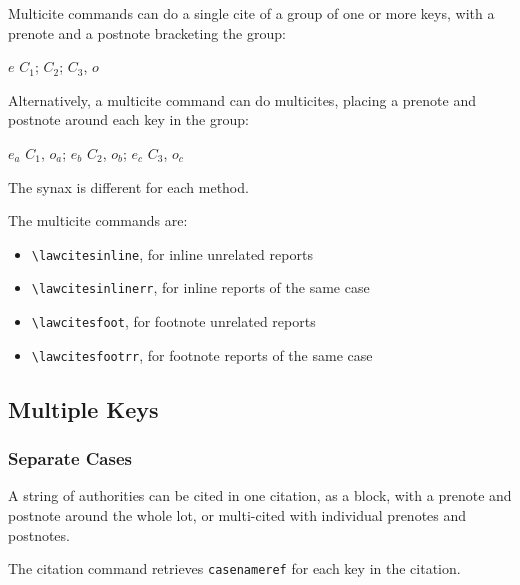 Multicite commands can do a single cite of a group of one or more keys, with a prenote and a postnote bracketing the group:

\begin{center}
\colorbox{yellow!12}{$e$ $C_1$; $C_2$; $C_3$, $o$}
\end{center}

Alternatively, a multicite command can do multicites, placing a prenote and postnote around each key in the group:

\begin{center}
\colorbox{yellow!12}{$e_a$ $C_1$, $o_a$; $e_b$ $C_2$, $o_b$; $e_c$ $C_3$, $o_c$}
\end{center}

The synax is different for each method.

The multicite commands are: 
\begin{itemize}
\item[] \verb|\lawcitesinline|, for inline unrelated reports
\item[] \verb|\lawcitesinlinerr|, for inline reports of the same case
\item[] \verb|\lawcitesfoot|, for footnote unrelated reports
\item[] \verb|\lawcitesfootrr|, for footnote reports of the same case
\end{itemize}


\subsection{Multiple Keys}
\subsubsection{Separate Cases}
A string of authorities can be cited in one citation, as a block, with a prenote and postnote around the whole lot, or multi-cited with individual prenotes and postnotes.

The citation command retrieves \texttt{casenameref} for each key in the citation.
\bigskip

